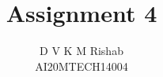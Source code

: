 \documentclass[journal,12pt,twocolumn]{IEEEtran}
\begin{document}
\makeatletter
{}
\makeatother
\let\StandardTheFigure\thefigure
\let\vec\mathbf
\def\putbox#1#2#3{\makebox[0in][l]{\makebox[#1][l]{}\raisebox{\baselineskip}[0in][0in]{\raisebox{#2}[0in][0in]{#3}}}}
     \def\rightbox#1{\makebox[0in][r]{#1}}
     \def\centbox#1{\makebox[0in]{#1}}
     \def\topbox#1{\raisebox{-\baselineskip}[0in][0in]{#1}}
     \def\midbox#1{\raisebox{-0.5\baselineskip}[0in][0in]{#1}}
\vspace{3cm}
\title{Assignment 4}
\author{D V K M Rishab \\ AI20MTECH14004}
%
%
%
% 
%
\end{document}
